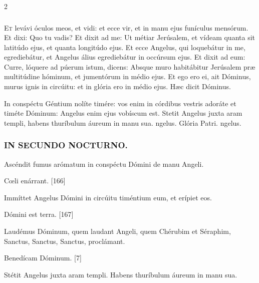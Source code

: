 \documentclass[9pt,twoside]{extarticle}
\begin{document}
\begin{multicols}{2}
\subsubsection*{\center {}}
\lettrine{E}t levávi óculos meos, et vidi: et ecce vir, et in manu ejus funículus mensórum.
Et dixi: Quo tu vadis? Et dixit ad me: Ut métiar Jerúsalem, et vídeam quanta sit latitúdo ejus, et quanta longitúdo ejus.
Et ecce Angelus, qui loquebátur in me, egrediebátur, et Angelus álius egrediebátur in occúrsum ejus.
Et dixit ad eum: Curre, lóquere ad púerum istum, dicens: Absque muro habitábitur Jerúsalem præ multitúdine hóminum, et jumentórum in médio ejus.
Et ego ero ei, ait Dóminus, murus ignis in circúitu: et in glória ero in médio ejus. Hæc dicit Dóminus.

\begin{tightlist}{}
\item {} In conspéctu Géntium nolíte timére: vos enim in córdibus vestris adoráte et timéte Dóminum: \textred{*} Angelus enim ejus vobíscum est.  Stetit Angelus juxta aram templi, habens thuríbulum áureum in manu sua. ngelus. Glória Patri. ngelus.
\end{tightlist}

\subsubsection*{\center \textsc{IN SECUNDO NOCTURNO.}}
\begin{tightlist}{}
\item {} Ascéndit fumus arómatum in conspéctu Dómini de manu Angeli.
\item {} Cœli enárrant. [166]
\item {} Immíttet Angelus Dómini in circúitu timéntium eum, et erípiet eos.
\item {} Dómini est terra. [167]
\item {} Laudémus Dóminum, quem laudant Angeli, quem Chérubim et Séraphim, Sanctus, Sanctus, Sanctus, proclámant.
\item {} Benedícam Dóminum. [7]
\item {} Stétit Angelus juxta aram templi.  Habens thuríbulum áureum in manu sua.
\end{tightlist}


\end{multicols}
\end{document}

